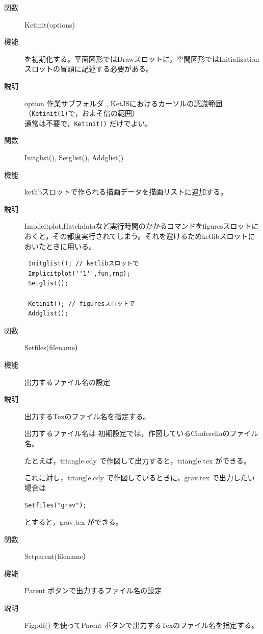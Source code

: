 \documentclass[papersize,a4paper,10pt,uplatex]{jsarticle}
\begin{document}
\begin{description}

\vspace{\baselineskip}
\hypertarget{ketinit}{}
\item[関数]Ketinit(options)
\item[機能]\ketcindy を初期化する。平面図形ではDrawスロットに，空間図形ではInitialization スロットの冒頭に記述する必要がある。
\item[説明]option 作業サブフォルダ%
, KetJSにおけるカーソルの認識範囲（\verb|Ketinit(1)|で，およそ倍の範囲）\\ %
\phantom{option }通常は不要で，\verb|Ketinit()| だけでよい。

\vspace{\baselineskip}
\hypertarget{Initglist}{}
\item[関数]Initglist(), Setglist(), Addglist()
\item[機能]ketlibスロットで作られる描画データを描画リストに追加する。
\item[説明]Implicitplot,Hatchdataなど実行時間のかかるコマンドをfiguresスロットにおくと，その都度実行されてしまう。それを避けるためketlibスロットにおいたときに用いる。

\begin{verbatim}
 Initglist(); // ketlibスロットで
 Implicitplot(''1'',fun,rng);
 Setglist();

 Ketinit(); // figuresスロットで
 Addglist();
\end{verbatim}

\vspace{\baselineskip}
\hypertarget{setfiles}{}
\item[関数]Setfiles(filename）
\item[機能]出力するファイル名の設定
\item[説明]出力するTexのファイル名を指定する。

出力するファイル名は 初期設定では，作図しているCinderellaのファイル名。

たとえば，triangle.cdy で作図して出力すると，triangle.tex ができる。

これに対し，triangle.cdy で作図しているときに，grav.tex で出力したい場合は

\hspace{10mm}\verb|Setfiles("grav");|

とすると，grav.tex ができる。

\vspace{\baselineskip}
\hypertarget{setparent}{}
\item[関数]Setparent(filename）
\item[機能]Parent ボタンで出力するファイル名の設定
\item[説明]Figpdf() を使ってParent ボタンで出力するTexのファイル名を指定する。


\end{description}
\end{document}
